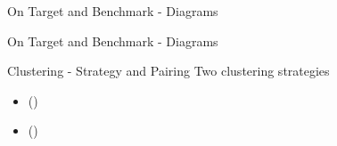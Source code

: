 
\begin{frame}{On Target and Benchmark - Diagrams}
\end{frame}


\begin{frame}{On Target and Benchmark - Diagrams} 
\end{frame}


\begin{frame}{Clustering - Strategy and Pairing} \pause
    Two clustering strategies\\ \pause 
    \begin{itemize}
        \item \fullNameClusterStrategyA{} (\nameClusterStrategyA{})
        \item \fullNameClusterStrategyB{} (\nameClusterStrategyB{})
    \end{itemize}
\end{frame}


